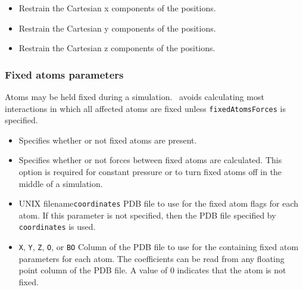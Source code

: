 \begin{itemize}
\item
{}
{Restrain the Cartesian x components of the positions.}
\item
{}
{Restrain the Cartesian y components of the positions.}
\item
{}
{Restrain the Cartesian z components of the positions.}

\end{itemize}

\subsubsection{Fixed atoms parameters}

Atoms may be held fixed during a simulation.  \PDAC\ avoids calculating most interactions in which all affected atoms are fixed unless {\tt fixedAtomsForces} is specified.

\begin{itemize}

\item
{}
{Specifies whether or not fixed atoms are present.} 

\item
{}
{Specifies whether or not forces between fixed atoms are calculated.  This option is required for constant pressure or to turn fixed atoms off in the middle of a simulation.}

\item
{}
{UNIX filename}{{\tt coordinates}}
{PDB file to use for the fixed atom flags for each atom.  
If this parameter is not specified, then 
the PDB file specified by {\tt coordinates} is used.}

\item
{}
{{\tt X}, {\tt Y}, {\tt Z}, {\tt O}, or {\tt B}}{{\tt O}} 
{Column of the PDB file to use for the containing fixed atom parameters for 
each atom.  The coefficients can be read from any 
floating point column of the PDB file.  
A value of 0 indicates that the atom is not fixed.}

\end{itemize}

